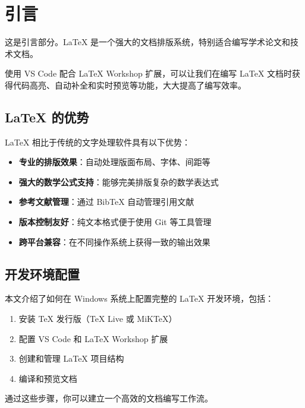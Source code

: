 \section{引言}%
\label{sec:introduction}

这是引言部分。LaTeX 是一个强大的文档排版系统，特别适合编写学术论文和技术文档\cite{lamport1994latex}。

使用 VS Code 配合 LaTeX Workshop 扩展，可以让我们在编写 LaTeX 文档时获得代码高亮、自动补全和实时预览等功能，大大提高了编写效率\cite{mittelbach2004latex}。

\subsection{LaTeX 的优势}
LaTeX 相比于传统的文字处理软件具有以下优势\cite{knuth1984literate}：

\begin{itemize}
    \item \textbf{专业的排版效果}：自动处理版面布局、字体、间距等
    \item \textbf{强大的数学公式支持}：能够完美排版复杂的数学表达式
    \item \textbf{参考文献管理}：通过 BibTeX 自动管理引用文献
    \item \textbf{版本控制友好}：纯文本格式便于使用 Git 等工具管理
    \item \textbf{跨平台兼容}：在不同操作系统上获得一致的输出效果
\end{itemize}

\subsection{开发环境配置}
本文介绍了如何在 Windows 系统上配置完整的 LaTeX 开发环境，包括：

\begin{enumerate}
    \item 安装 TeX 发行版（TeX Live 或 MiKTeX）
    \item 配置 VS Code 和 LaTeX Workshop 扩展
    \item 创建和管理 LaTeX 项目结构
    \item 编译和预览文档
\end{enumerate}

通过这些步骤，你可以建立一个高效的文档编写工作流。
